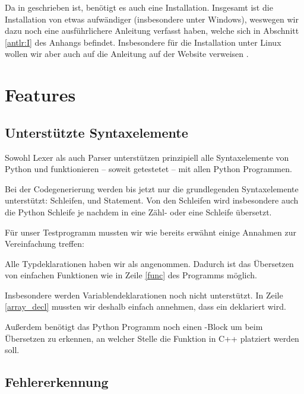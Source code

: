 Da  in  geschrieben ist, benötigt es auch eine  Installation. Insgesamt ist die Installation von  etwas aufwändiger (insbesondere unter Windows), weswegen wir dazu noch eine ausführlichere Anleitung verfasst haben, welche sich in Abschnitt \ref{antlr:I} des Anhangs befindet. Insbesondere für die Installation unter Linux wollen wir aber auch auf die Anleitung auf der  Website verweisen \cite{antlr}.





\section{Features} \label{features}

\subsection{Unterstützte Syntaxelemente}

Sowohl Lexer als auch Parser unterstützen prinzipiell alle Syntaxelemente von Python und funktionieren -- soweit getestetet -- mit allen Python Programmen. %

Bei der Codegenerierung werden bis jetzt nur die grundlegenden Syntaxelemente unterstützt: Schleifen,  und  Statement. Von den Schleifen wird insbesondere auch die Python  Schleife je nachdem in eine Zähl- oder eine  Schleife übersetzt.

Für unser Testprogramm mussten wir wie bereits erwähnt einige Annahmen zur Vereinfachung treffen:

Alle Typdeklarationen haben wir als  angenommen. Dadurch ist das Übersetzen von einfachen Funktionen wie in Zeile \ref{func} des Programms möglich.

Insbesondere werden Variablendeklarationen noch nicht unterstützt. In Zeile \ref{array_decl} mussten wir deshalb einfach annehmen, dass ein  deklariert wird.

Außerdem benötigt das Python Programm noch einen -Block um beim Übersetzen zu erkennen, an welcher Stelle die  Funktion in C++ platziert werden soll.

 

\subsection{Fehlererkennung}

